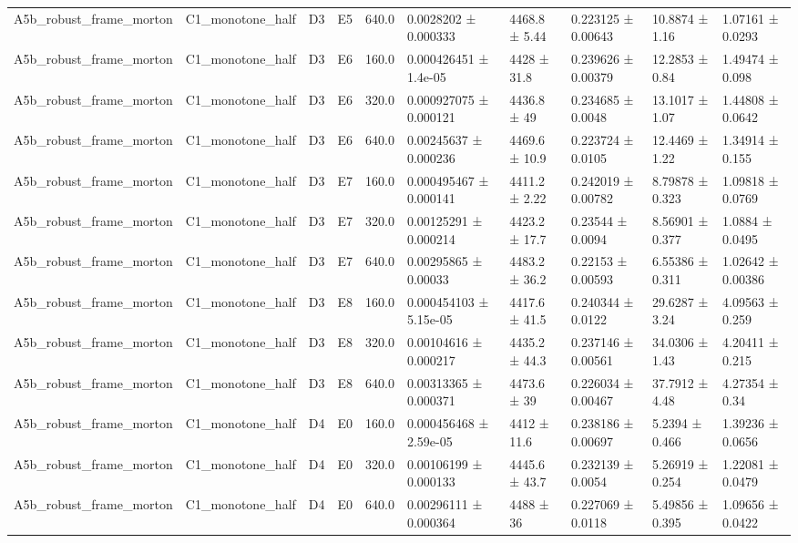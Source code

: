 \begin{table}
\begin{tabular}{llllllllll}
A5b\_robust\_frame\_morton & C1\_monotone\_half & D3 & E5 & 640.0 & 0.0028202 ± 0.000333 & 4468.8 ± 5.44 & 0.223125 ± 0.00643 & 10.8874 ± 1.16 & 1.07161 ± 0.0293 \\
A5b\_robust\_frame\_morton & C1\_monotone\_half & D3 & E6 & 160.0 & 0.000426451 ± 1.4e-05 & 4428 ± 31.8 & 0.239626 ± 0.00379 & 12.2853 ± 0.84 & 1.49474 ± 0.098 \\
A5b\_robust\_frame\_morton & C1\_monotone\_half & D3 & E6 & 320.0 & 0.000927075 ± 0.000121 & 4436.8 ± 49 & 0.234685 ± 0.0048 & 13.1017 ± 1.07 & 1.44808 ± 0.0642 \\
A5b\_robust\_frame\_morton & C1\_monotone\_half & D3 & E6 & 640.0 & 0.00245637 ± 0.000236 & 4469.6 ± 10.9 & 0.223724 ± 0.0105 & 12.4469 ± 1.22 & 1.34914 ± 0.155 \\
A5b\_robust\_frame\_morton & C1\_monotone\_half & D3 & E7 & 160.0 & 0.000495467 ± 0.000141 & 4411.2 ± 2.22 & 0.242019 ± 0.00782 & 8.79878 ± 0.323 & 1.09818 ± 0.0769 \\
A5b\_robust\_frame\_morton & C1\_monotone\_half & D3 & E7 & 320.0 & 0.00125291 ± 0.000214 & 4423.2 ± 17.7 & 0.23544 ± 0.0094 & 8.56901 ± 0.377 & 1.0884 ± 0.0495 \\
A5b\_robust\_frame\_morton & C1\_monotone\_half & D3 & E7 & 640.0 & 0.00295865 ± 0.00033 & 4483.2 ± 36.2 & 0.22153 ± 0.00593 & 6.55386 ± 0.311 & 1.02642 ± 0.00386 \\
A5b\_robust\_frame\_morton & C1\_monotone\_half & D3 & E8 & 160.0 & 0.000454103 ± 5.15e-05 & 4417.6 ± 41.5 & 0.240344 ± 0.0122 & 29.6287 ± 3.24 & 4.09563 ± 0.259 \\
A5b\_robust\_frame\_morton & C1\_monotone\_half & D3 & E8 & 320.0 & 0.00104616 ± 0.000217 & 4435.2 ± 44.3 & 0.237146 ± 0.00561 & 34.0306 ± 1.43 & 4.20411 ± 0.215 \\
A5b\_robust\_frame\_morton & C1\_monotone\_half & D3 & E8 & 640.0 & 0.00313365 ± 0.000371 & 4473.6 ± 39 & 0.226034 ± 0.00467 & 37.7912 ± 4.48 & 4.27354 ± 0.34 \\
A5b\_robust\_frame\_morton & C1\_monotone\_half & D4 & E0 & 160.0 & 0.000456468 ± 2.59e-05 & 4412 ± 11.6 & 0.238186 ± 0.00697 & 5.2394 ± 0.466 & 1.39236 ± 0.0656 \\
A5b\_robust\_frame\_morton & C1\_monotone\_half & D4 & E0 & 320.0 & 0.00106199 ± 0.000133 & 4445.6 ± 43.7 & 0.232139 ± 0.0054 & 5.26919 ± 0.254 & 1.22081 ± 0.0479 \\
A5b\_robust\_frame\_morton & C1\_monotone\_half & D4 & E0 & 640.0 & 0.00296111 ± 0.000364 & 4488 ± 36 & 0.227069 ± 0.0118 & 5.49856 ± 0.395 & 1.09656 ± 0.0422 \\

\end{tabular}
\end{table}
